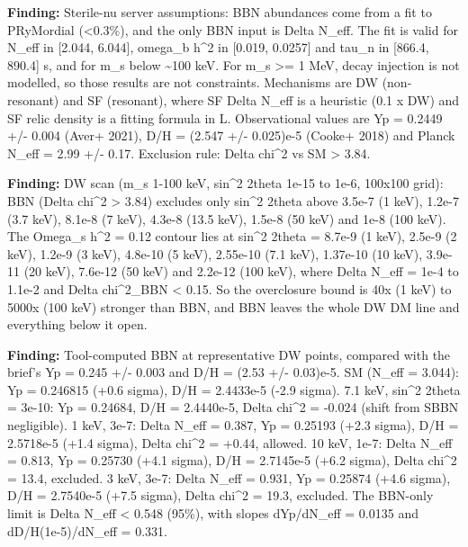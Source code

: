 \documentclass[11pt,a4paper]{article}
\begin{document}
\textbf{Finding:} Sterile-nu server assumptions: BBN abundances come from a fit to PRyMordial (\textless{}0.3\%), and the only BBN input is Delta N\_eff. The fit is valid for N\_eff in [2.044, 6.044], omega\_b h\textasciicircum{}2 in [0.019, 0.0257] and tau\_n in [866.4, 890.4] s, and for m\_s below \textasciitilde{}100 keV. For m\_s \textgreater{}= 1 MeV, decay injection is not modelled, so those results are not constraints. Mechanisms are DW (non-resonant) and SF (resonant), where SF Delta N\_eff is a heuristic (0.1 x DW) and SF relic density is a fitting formula in L. Observational values are Yp = 0.2449 +/- 0.004 (Aver+ 2021), D/H = (2.547 +/- 0.025)e-5 (Cooke+ 2018) and Planck N\_eff = 2.99 +/- 0.17. Exclusion rule: Delta chi\textasciicircum{}2 vs SM \textgreater{} 3.84.

\textbf{Finding:} DW scan (m\_s 1-100 keV, sin\textasciicircum{}2 2theta 1e-15 to 1e-6, 100x100 grid): BBN (Delta chi\textasciicircum{}2 \textgreater{} 3.84) excludes only sin\textasciicircum{}2 2theta above 3.5e-7 (1 keV), 1.2e-7 (3.7 keV), 8.1e-8 (7 keV), 4.3e-8 (13.5 keV), 1.5e-8 (50 keV) and 1e-8 (100 keV). The Omega\_s h\textasciicircum{}2 = 0.12 contour lies at sin\textasciicircum{}2 2theta = 8.7e-9 (1 keV), 2.5e-9 (2 keV), 1.2e-9 (3 keV), 4.8e-10 (5 keV), 2.55e-10 (7.1 keV), 1.37e-10 (10 keV), 3.9e-11 (20 keV), 7.6e-12 (50 keV) and 2.2e-12 (100 keV), where Delta N\_eff = 1e-4 to 1.1e-2 and \textbar{}Delta chi\textasciicircum{}2\_BBN\textbar{} \textless{} 0.15. So the overclosure bound is 40x (1 keV) to 5000x (100 keV) stronger than BBN, and BBN leaves the whole DW DM line and everything below it open.

\textbf{Finding:} Tool-computed BBN at representative DW points, compared with the brief's Yp = 0.245 +/- 0.003 and D/H = (2.53 +/- 0.03)e-5. SM (N\_eff = 3.044): Yp = 0.246815 (+0.6 sigma), D/H = 2.4433e-5 (-2.9 sigma). 7.1 keV, sin\textasciicircum{}2 2theta = 3e-10: Yp = 0.24684, D/H = 2.4440e-5, Delta chi\textasciicircum{}2 = -0.024 (shift from SBBN negligible). 1 keV, 3e-7: Delta N\_eff = 0.387, Yp = 0.25193 (+2.3 sigma), D/H = 2.5718e-5 (+1.4 sigma), Delta chi\textasciicircum{}2 = +0.44, allowed. 10 keV, 1e-7: Delta N\_eff = 0.813, Yp = 0.25730 (+4.1 sigma), D/H = 2.7145e-5 (+6.2 sigma), Delta chi\textasciicircum{}2 = 13.4, excluded. 3 keV, 3e-7: Delta N\_eff = 0.931, Yp = 0.25874 (+4.6 sigma), D/H = 2.7540e-5 (+7.5 sigma), Delta chi\textasciicircum{}2 = 19.3, excluded. The BBN-only limit is Delta N\_eff \textless{} 0.548 (95\%), with slopes dYp/dN\_eff = 0.0135 and dD/H(1e-5)/dN\_eff = 0.331.
\end{document}
